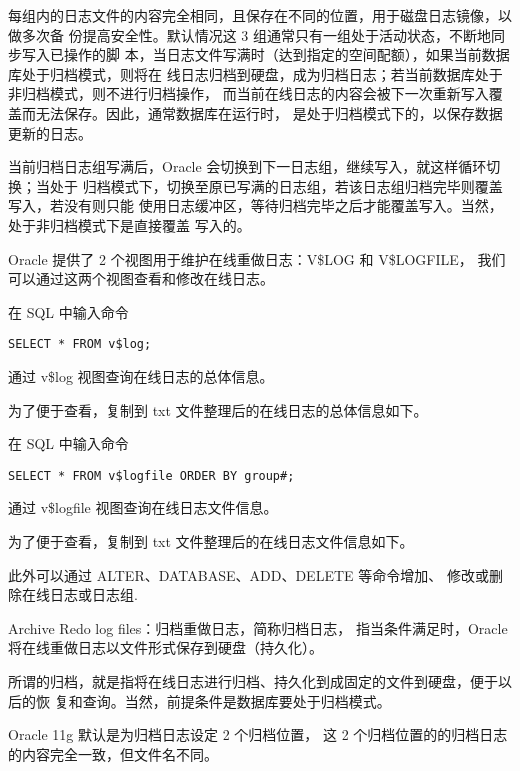 每组内的日志文件的内容完全相同，且保存在不同的位置，用于磁盘日志镜像，以做多次备
份提高安全性。默认情况这 3 组通常只有一组处于活动状态，不断地同步写入已操作的脚
本，当日志文件写满时（达到指定的空间配额），如果当前数据库处于归档模式，则将在
线日志归档到硬盘，成为归档日志；若当前数据库处于非归档模式，则不进行归档操作，
而当前在线日志的内容会被下一次重新写入覆盖而无法保存。因此，通常数据库在运行时，
是处于归档模式下的，以保存数据更新的日志。

当前归档日志组写满后，Oracle 会切换到下一日志组，继续写入，就这样循环切换；当处于
归档模式下，切换至原已写满的日志组，若该日志组归档完毕则覆盖写入，若没有则只能
使用日志缓冲区，等待归档完毕之后才能覆盖写入。当然，处于非归档模式下是直接覆盖
写入的。

Oracle 提供了 2 个视图用于维护在线重做日志：V\$LOG 和 V\$LOGFILE，
我们可以通过这两个视图查看和修改在线日志。

在 SQL 中输入命令
\begin{verbatim}
SELECT * FROM v$log;
\end{verbatim}
通过 v\$log 视图查询在线日志的总体信息。

为了便于查看，复制到 txt 文件整理后的在线日志的总体信息如下。

在 SQL 中输入命令
\begin{verbatim}
SELECT * FROM v$logfile ORDER BY group#;
\end{verbatim}
通过 v\$logfile 视图查询在线日志文件信息。

为了便于查看，复制到 txt 文件整理后的在线日志文件信息如下。

此外可以通过 ALTER、DATABASE、ADD、DELETE 等命令增加、
修改或删除在线日志或日志组.

Archive Redo log files：归档重做日志，简称归档日志，
指当条件满足时，Oracle 将在线重做日志以文件形式保存到硬盘（持久化）。

所谓的归档，就是指将在线日志进行归档、持久化到成固定的文件到硬盘，便于以后的恢
复和查询。当然，前提条件是数据库要处于归档模式。

Oracle 11g 默认是为归档日志设定 2 个归档位置，
这 2 个归档位置的的归档日志的内容完全一致，但文件名不同。

